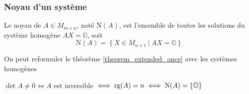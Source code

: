 \subsubsection{Noyau d'un système}
\begin{definition}
    Le noyau de $A \in M_{m \times n}$, noté $\text{N}(A)$, est l'ensemble de toutes les solutions du système homogène
    $AX = \mathbb{O}$, soit
    \[ \text{N}(A) = \left\{ X \in M_{n \times 1} \ | \ AX = \mathbb{O}  \right\} \]
\end{definition}
On peut reformuler le théorème \ref{theorem_extended_once} avec les systèmes homogènes
\begin{theorem}
    \label{inversible_rank_kernel_thm}
    $\det A \neq 0 \iff A $ est inversible $\iff \textup{rg}(A) = n \iff \textup{N}(A) = \left\{ \mathbb{O} \right\}$
\end{theorem}